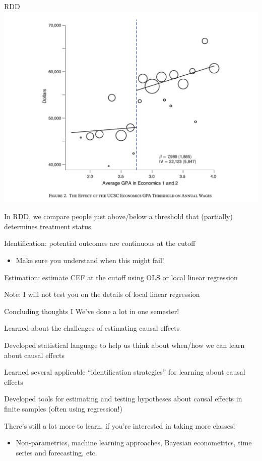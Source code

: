 \documentclass[11pt,english,handout]{beamer}
\newenvironment{wideitemize}{\itemize\addtolength{\itemsep}{10pt}}{\enditemize}
\begin{document}
\begin{frame}{RDD}
	\includegraphics[width = 0.5 \linewidth]{../Chapter8/bleemer-rf}
	
	\begin{wideitemize}
		\item
		In RDD, we compare people just above/below a threshold that (partially) determines treatment status
		
		\pause
		\item
		Identification: potential outcomes are continuous at the cutoff
			\begin{itemize}
				\item 
				Make sure you understand when this might fail!
			\end{itemize}
		
		\pause
		\item
		Estimation: estimate CEF at the cutoff using OLS or local linear regression
			\begin{wideitemize}
				\item
				Note: I will not test you on the details of local linear regression
			\end{wideitemize}
	\end{wideitemize}
\end{frame}


\begin{frame}{Concluding thoughts I}
We've done a lot in one semester! \medskip

\begin{wideitemize}
	\item
	Learned about the challenges of estimating causal effects
	
	\item
	Developed statistical language to help us think about when/how we can learn about causal effects
	
	\item
	Learned several applicable ``identification strategies'' for learning about causal effects
	
	\item
	Developed tools for estimating and testing hypotheses about causal effects in finite samples (often using regression!)
\end{wideitemize}

\pause
\medskip
There's still a lot more to learn, if you're interested in taking more classes!
	\begin{itemize}
		\item 
		Non-parametrics, machine learning approaches, Bayesian econometrics, time series and forecasting, etc.
	\end{itemize}

\end{frame}
\end{document}
